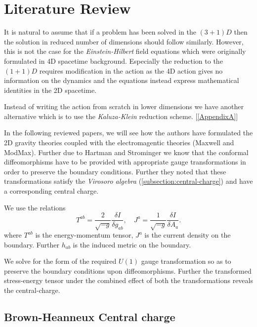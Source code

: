 
\chapter{Literature Review}

\label{Chapter2}


It is natural to assume that if a problem has been solved in the $\left(3+1  \right) D$ then the solution in reduced number of dimensions should follow similarly. However, this is not the case for the \textit{Einstein-Hilbert} field equations which were originally formulated in 4D spacetime background. Especially the reduction to the $\left( 1+1 \right) D$ requires modification in the action as the 4D action gives no information on the dynamics and the equations instead express mathematical identities in the 2D spacetime.

Instead of writing the action from scratch in lower dimensions we have another alternative which is to use the \textit{Kaluza-Klein} reduction scheme. [\ref{AppendixA}]

In the following reviewed papers, we will see how the authors have formulated the 2D gravity theories coupled with the electromagentic theories (Maxwell and ModMax). Further due to Hartman and Strominger \cite{HartmanStrominger} we know that the conformal diffeomorphisms have to be provided with appropriate gauge transformations in order to preserve the boundary conditions. Further they noted that these transformations satisfy the \textit{Virosoro algebra} (\ref{subsection:central-charge}) and have a corresponding central charge.

We use the relations 
\begin{equation}
    T^{ab} = \frac{2}{\sqrt{-g}} \frac{\delta I}{\delta g_{ab}}, \quad J^a = \frac{1}{\sqrt{-g}} \frac{\delta I}{\delta A_a}.
\end{equation}
where $T^{ab}$ is the energy-momentum tensor, $J^a$ is the current density on the boundary. Further $h_{ab}$ is the induced metric on the boundary. 

We solve for the form of the required $U(1)$ gauge transformation so as to preserve the boundary conditions upon diffeomorphisms. Further the transformed stress-energy tensor under the combined effect of both the transformations reveals the central-charge. 

\section{Brown-Heanneux Central charge \cite{brown1986central}}


